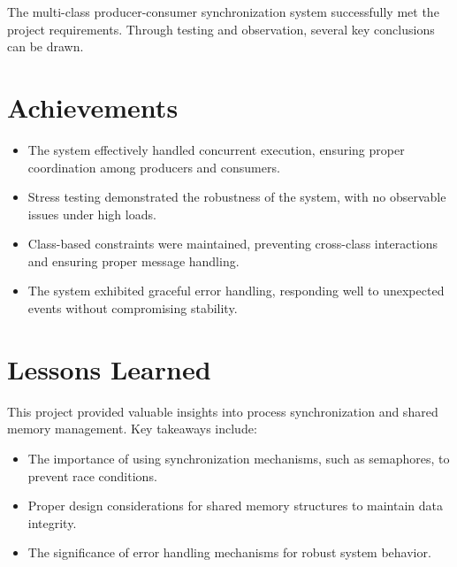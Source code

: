 The multi-class producer-consumer synchronization system successfully met the project requirements. Through testing and observation, several key conclusions can be drawn.

\section{Achievements}

\begin{itemize}
    \item The system effectively handled concurrent execution, ensuring proper coordination among producers and consumers.
    \item Stress testing demonstrated the robustness of the system, with no observable issues under high loads.
    \item Class-based constraints were maintained, preventing cross-class interactions and ensuring proper message handling.
    \item The system exhibited graceful error handling, responding well to unexpected events without compromising stability.
\end{itemize}

\section{Lessons Learned}

This project provided valuable insights into process synchronization and shared memory management. Key takeaways include:

\begin{itemize}
    \item The importance of using synchronization mechanisms, such as semaphores, to prevent race conditions.
    \item Proper design considerations for shared memory structures to maintain data integrity.
    \item The significance of error handling mechanisms for robust system behavior.
\end{itemize}